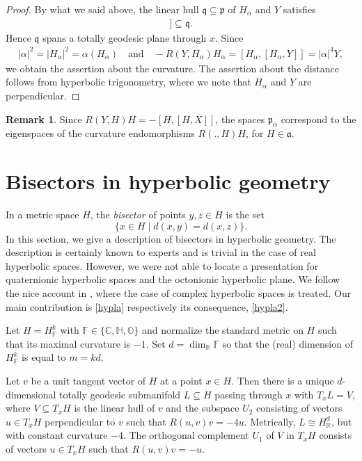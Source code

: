 \documentclass[12pt,a4paper]{amsart}
\newcounter{alph}
\numberwithin{equation}{section}
\theoremstyle{definition}
\newtheorem{rem}[equation]{Remark}
\def\C{\mathbb C}
\def\F{\mathbb F}
\def\H{\mathbb H}
\def\O{\mathbb O}
\def\R{\mathbb R}
\begin{document}
\begin{proof}
By what we said above, the linear hull $\mathfrak q\subseteq\mathfrak p$ of $H_\alpha$ and $Y$ satisfies
\begin{align*}
	[\mathfrak q,[\mathfrak q,\mathfrak q]] \subseteq \mathfrak q.
\end{align*}
Hence $\mathfrak q$ spans a totally geodesic plane through $x$.
Since
\begin{align*}
	|\alpha|^2=|H_\alpha|^2=\alpha(H_\alpha)
	\quad\text{and}\quad
	- R(Y,H_\alpha)H_\alpha = [H_\alpha,[H_\alpha,Y]] = |\alpha|^4 Y,
\end{align*}
we obtain the assertion about the curvature.
The assertion about the distance follows from hyperbolic trigonometry,
where we note that $H_\alpha$ and $Y$ are perpendicular.
\end{proof}

\begin{rem}\label{hyplar}
Since $R(Y,H)H=-[H,[H,X]]$, the spaces $\mathfrak p_\alpha$ correspond to the eigenspaces of the curvature endomorphisms $R(.,H)H$,
for $H\in\mathfrak a$.
\end{rem}

\section{Bisectors in hyperbolic geometry}\label{bisec}

In a metric space $H$, the \emph{bisector} of points $y,z\in H$ is the set \[\{x\in H\mid d(x,y)=d(x,z)\}.\]
In this section, we give a description of bisectors in hyperbolic geometry.
The description is certainly known to experts and is trivial in the case of real hyperbolic spaces.
However, we were not able to locate a presentation for quaternionic hyperbolic spaces and the octonionic hyperbolic plane.
We follow the nice account in \cite[Section 5]{Go}, where the case of complex hyperbolic spaces is treated.
Our main contribution is \cref{hypla} respectively its consequence, \cref{hypla2}.

Let $H=H^k_\F$ with $\F\in\{\C,\H,\O\}$ and normalize the standard metric on $H$ such that its maximal  curvature is $-1$.
Set $d=\dim_\R\F$ so that the (real) dimension of $H^k_\F$ is equal to $m=kd$.

Let $v$ be a unit tangent vector of $H$ at a point $x\in H$.
Then there is a unique $d$-dimensional totally geodesic submanifold $L\subseteq H$ passing through $x$ with $T_xL=V$,
where $V\subseteq T_xH$ is the linear hull of $v$ and the subspace $U_2$ consisting of vectors $u\in T_xH$ perpendicular to $v$ such that $R(u,v)v=-4u$.
Metrically, $L\cong H_\R^d$, but with constant  curvature $-4$.
The orthogonal complement $U_1$ of $V$ in $T_xH$ consists of vectors $u\in T_xH$ such that $R(u,v)v=-u$. 
\end{document}
